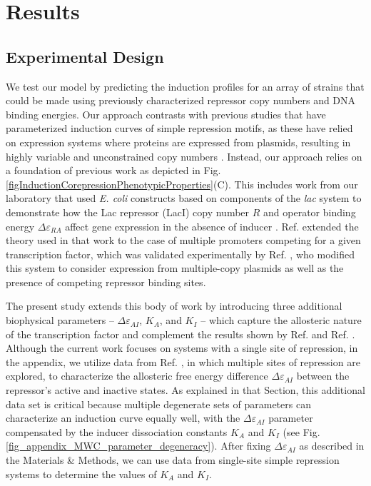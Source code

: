 \section{Results}
\subsection{Experimental Design}
We test our model by predicting the induction profiles for an array of
strains that could be made using previously characterized repressor copy
numbers and DNA binding energies. Our approach contrasts with previous
studies that have parameterized induction curves of simple repression motifs,
as these have relied on expression systems where proteins are expressed from
plasmids, resulting in highly variable and unconstrained copy numbers
\cite{Murphy2007, Daber2009, Murphy2010, Daber2011a, Sochor2014}. Instead,
our approach relies on a foundation of previous work as depicted in
Fig. \ref{figInductionCorepressionPhenotypicProperties}(C). This
includes work from our laboratory that used \textit{E. coli} constructs based
on components of the \textit{lac} system to demonstrate how the Lac repressor
(LacI) copy number $R$ and operator binding energy $\Delta\varepsilon_{RA}$
affect gene expression in the absence of inducer \cite{Garcia2011}.
Ref. \cite{Rydenfelt2014B} extended the theory used in that work to the case
of multiple promoters competing for a given transcription factor, which was
validated experimentally by Ref. \cite{Brewster2014}, who modified this system
to consider expression from multiple-copy plasmids as well as the presence of
competing repressor binding sites.

The present study extends this body of work by introducing three additional
biophysical parameters -- $\Delta\varepsilon_{AI}$, $K_A$, and $K_I$ -- which
capture the allosteric nature of the transcription factor and complement the
results shown by Ref. \cite{Garcia2011} and Ref. \cite{Brewster2014}. Although the
current work focuses on systems with a single site of repression, in the appendix, 
we utilize data from Ref. \cite{Brewster2014}, in which multiple sites of repression are explored, to
characterize the allosteric free energy difference $\Delta\varepsilon_{AI}$
between the repressor's active and inactive states. As explained in that
Section, this additional data set is critical because multiple degenerate sets
of parameters can characterize an induction curve equally well, with the
$\Delta\varepsilon_{AI}$ parameter compensated by the inducer dissociation
constants $K_A$ and $K_I$ (see Fig. \ref{fig_appendix_MWC_parameter_degeneracy}).
After fixing $\Delta\varepsilon_{AI}$ as described in the
Materials \& Methods, we can use data from single-site simple repression
systems to determine the values of $K_A$ and $K_I$.

